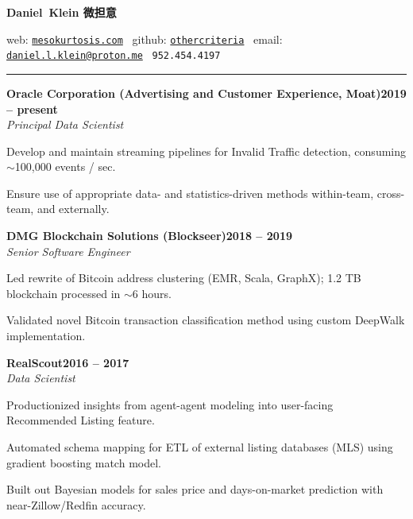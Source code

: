 \documentclass{article}
\newcommand{\ressection}[1]{\noindent{\large\textbf{#1}}\vspace{2pt}\hrule\vspace{4pt}}
\newcommand{\leftandright}[2]{\noindent\textbf{#1}\hfill\textbf{#2}}
\begin{document}
\sffamily

\noindent
\begin{center}
    
\textbf{\huge{Daniel~Klein 微担意}}

web: \href{http://mesokurtosis.com}{\texttt{mesokurtosis.com}}
\textbullet\,
github: \href{https://github.com/othercriteria}{\texttt{othercriteria}}
\textbullet\,
email: \href{mailto:daniel.l.klein@proton.me}{\texttt{daniel.l.klein@proton.me}}
\textbullet\,
\texttt{952.454.4197}

\end{center}

\ressection{Experience}

\leftandright{Oracle Corporation (Advertising and Customer Experience, Moat)}{2019 -- present} \\
\textit{Principal Data Scientist}

\begin{itemize*}
\item Develop and maintain streaming pipelines for Invalid Traffic
  detection, consuming $\sim$100,000 events / sec.
\item Ensure use of appropriate data- and statistics-driven methods
  within-team, cross-team, and externally.
\end{itemize*}

\leftandright{DMG Blockchain Solutions (Blockseer)}{2018 -- 2019} \\
\textit{Senior Software Engineer}

\begin{itemize*}
\item Led rewrite of Bitcoin address clustering (EMR, Scala, GraphX);
  1.2 TB blockchain processed in $\sim$6 hours.
\item Validated novel Bitcoin transaction classification method using
  custom DeepWalk implementation.
\end{itemize*}

\leftandright{RealScout}{2016 -- 2017} \\
\textit{Data Scientist}

\begin{itemize*}
\item Productionized insights from agent-agent modeling into
  user-facing Recommended Listing feature.
\item Automated schema mapping for ETL of external listing databases
  (MLS) using gradient boosting match model.
\item Built out Bayesian models for sales price and days-on-market
  prediction with near-Zillow/Redfin accuracy.
\end{itemize*}
\end{document}
